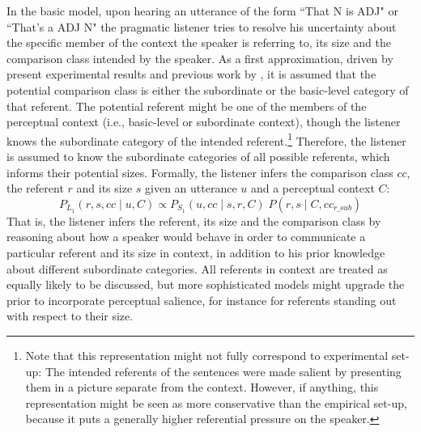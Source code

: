 In the basic model, upon hearing an utterance of the form ``That N is ADJ" or ``That's a ADJ N" the pragmatic listener tries to resolve his uncertainty about the specific member of the context the speaker is referring to, its size and the comparison class intended by the speaker. As a first approximation, driven by present experimental results and previous work by \textcite{tessler2017warm}, it is assumed that the potential comparison class is either the subordinate or the basic-level category of that referent. The potential referent might be one of the members of the perceptual context (i.e., basic-level or subordinate context), though the listener knows the subordinate category of the intended referent.\footnote{Note that this representation might not fully correspond to experimental set-up: The intended referents of the sentences were made salient by presenting them in a picture separate from the context. However, if anything, this representation might be seen as more conservative than the empirical set-up, because it puts a generally higher referential pressure on the speaker.} Therefore, the listener is assumed to know the subordinate categories of all possible referents, which informs their potential sizes.
Formally, the listener infers the comparison class $cc$, the referent $r$ and its size $s$ given an utterance $u$ and a perceptual context $C$:
\begin{equation}
P_{L_1} (r, s, cc \mid u, C) \propto P_{S_1} (u, cc \mid s, r, C) \; P(r, s \mid C, cc_{r\_sub}) 
\end{equation}
That is, the listener infers the referent, its size and the comparison class by reasoning about how a speaker would behave in order to communicate a particular referent and its size in context, in addition to his prior knowledge about different subordinate categories. All referents in context are treated as equally likely to be discussed, but more sophisticated models might upgrade the prior to incorporate perceptual salience, for instance for referents standing out with respect to their size. 


